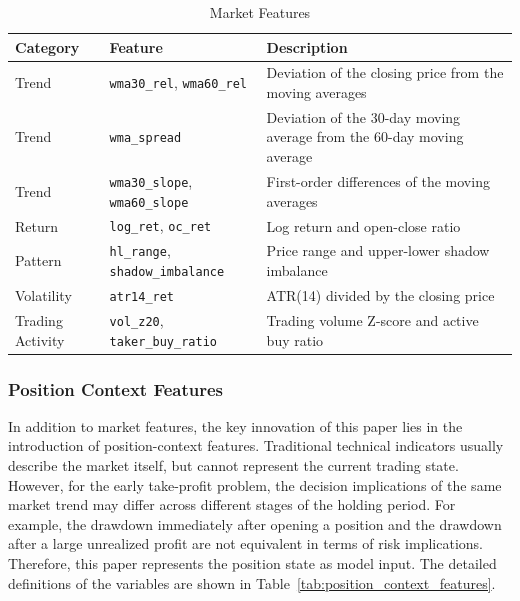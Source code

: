 \documentclass[12pt]{article}
\begin{document}
\begin{table}[htbp]
\centering
\caption{Market Features}
\label{tab:market_features}
\small
\renewcommand{\arraystretch}{1.2}
\begin{tabular}{p{}p{}p{}}
\toprule
Category & Feature & Description \\
\midrule
Trend &
\texttt{wma30\_rel}, \texttt{wma60\_rel} &
Deviation of the closing price from the moving averages \\
Trend &
\texttt{wma\_spread} &
Deviation of the 30-day moving average from the 60-day moving average \\
Trend &
\texttt{wma30\_slope}, \texttt{wma60\_slope} &
First-order differences of the moving averages \\
Return &
\texttt{log\_ret}, \texttt{oc\_ret} &
Log return and open-close ratio \\
Pattern &
\texttt{hl\_range}, \texttt{shadow\_imbalance} &
Price range and upper-lower shadow imbalance \\
Volatility &
\texttt{atr14\_ret} &
ATR(14) divided by the closing price \\
Trading Activity &
\texttt{vol\_z20}, \texttt{taker\_buy\_ratio} &
Trading volume Z-score and active buy ratio \\
\bottomrule
\end{tabular}
\end{table}

\subsubsection{Position Context Features}

In addition to market features, the key innovation of this paper lies in the introduction of 
position-context features. Traditional technical indicators usually describe the market itself, 
but cannot represent the current trading state. However, for the early take-profit problem, the 
decision implications of the same market trend may differ across different stages of the 
holding period. For example, the drawdown immediately after opening a position and the drawdown 
after a large unrealized profit are not equivalent in terms of risk implications. Therefore, 
this paper represents the position state as model input. The detailed definitions of the 
variables are shown in Table~\ref{tab:position_context_features}.
\end{document}
